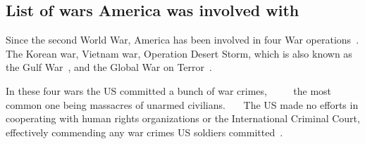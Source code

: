 \subsection{List of wars America was involved with}
Since the second World War, America has been involved in four War operations~\autocite{va-gov-american-wars}.
The Korean war, Vietnam war, Operation Desert Storm, which is also known as the Gulf War~\autocite{defense-gov-gulf}, and the Global War on Terror~\autocite{va-gov-american-wars}.

In these four wars the US committed a bunch of war crimes, ~\autocite{globalpolicy-iraq-warcrimes}~\autocite{historynews-vietnam-warcrimes}~\autocite{hrw-hr-abuses-afghanistan}~\autocite{washingtonpost-korea-warcrimes} the most common one being massacres of unarmed civilians.~\autocite{asiasociety-nogun-ri}~\autocite{history-my-lai}~\autocite{theguardian-shinwar-shooting} The US made no efforts in cooperating with human rights organizations or the International Criminal Court, effectively commending any war crimes US soldiers committed~\autocite{globaltimes-us-evade-warcrimes}.